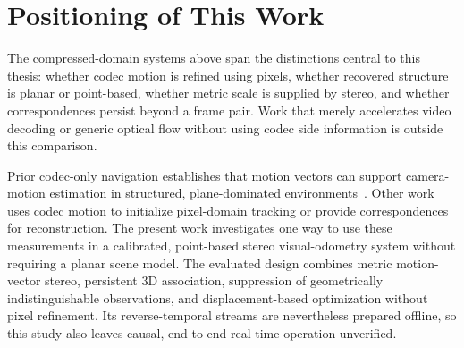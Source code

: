 \section{Positioning of This Work}

The compressed-domain systems above span the distinctions central to this thesis: whether
codec motion is refined using pixels, whether recovered structure is planar or
point-based, whether metric scale is supplied by stereo, and whether
correspondences persist beyond a frame pair. Work that merely accelerates video
decoding or generic optical flow without using codec side information is outside
this comparison.

Prior codec-only navigation establishes that motion vectors can support
camera-motion estimation in structured, plane-dominated
environments~\cite{li2014toward}. Other work uses codec motion to initialize
pixel-domain tracking or provide correspondences for reconstruction. The present
work investigates one way to use these measurements in a calibrated, point-based
stereo visual-odometry system without requiring a planar scene model. The
evaluated design combines metric motion-vector stereo, persistent 3D
association, suppression of geometrically indistinguishable observations, and
displacement-based optimization without pixel refinement. Its reverse-temporal
streams are nevertheless prepared offline, so this study also leaves causal,
end-to-end real-time operation unverified.


